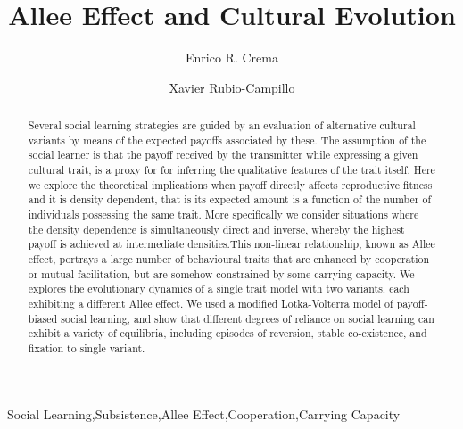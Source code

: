 \documentclass[3p,authoryear,twocolumn]{elsarticle} %
\begin{document}
\begin{frontmatter}

\title{Allee Effect and Cultural Evolution}


\author[label1,label2]{Enrico R. Crema}
\author[label3]{Xavier Rubio-Campillo}

\address[label1]{CaSEs - Complexity and Socio-Ecological Dynamics Research Group, Barcelona}
\address[label2]{UCL Institute of Archaeology}
\address[label3]{BSC - Barcelona Supercomputing Center}



\begin{abstract}
Several social learning strategies are guided by an evaluation of alternative cultural variants by means of the expected payoffs associated by these. The assumption of the social learner is that the payoff received by the transmitter while expressing a given cultural trait, is a proxy for for inferring the qualitative features of the trait itself. Here we explore the theoretical implications when payoff directly affects reproductive fitness and it is density dependent, that is its expected amount is a function of the number of individuals possessing the same trait. More specifically we consider situations where the density dependence is simultaneously direct and inverse, whereby the highest payoff is achieved at intermediate densities.This non-linear relationship, known as Allee effect, portrays a large number of behavioural traits that are enhanced by cooperation or mutual facilitation, but are somehow constrained by some carrying capacity.  We  explores the evolutionary dynamics of a single trait model with two variants, each exhibiting a different Allee effect. We used a modified Lotka-Volterra model of payoff-biased social learning, and show that different degrees of reliance on social learning can exhibit a variety of equilibria, including episodes of reversion, stable co-existence, and fixation to single variant.

\end{abstract}

\begin{keyword}
Social Learning\sep Subsistence\sep Allee Effect\sep Cooperation\sep Carrying Capacity
\end{keyword}

\end{frontmatter}
\end{document}
